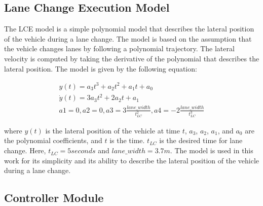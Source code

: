 \subsection{Lane Change Execution Model}
The LCE model is a simple polynomial model that describes the lateral position of the vehicle during a lane change. The model is based on the assumption that the vehicle changes lanes by following a polynomial trajectory. The lateral velocity is computed by taking the derivative of the polynomial that describes the lateral position. The model is given by the following equation:

\begin{multline}
    y(t) = a_3 t^3 + a_2 t^2 + a_1 t + a_0\\
    \dot{y}(t) = 3a_3 t^2 + 2a_2 t + a_1\\
    a1 = 0, a2 = 0, a3 = 3 \frac{lane\_width}{t_{LC}^2}, a4 = -2 \frac{lane\_width}{t_{LC}^3}
\end{multline}

where $y(t)$ is the lateral position of the vehicle at time $t$, $a_3$, $a_2$, $a_1$, and $a_0$ are the polynomial coefficients, and $t$ is the time. $t_{LC}$ is the desired time for lane change. Here, $t_{LC} = 5 seconds$ and $lane\_width = 3.7 m$. The model is used in this work for its simplicity and its ability to describe the lateral position of the vehicle during a lane change.



\subsection{Controller Module}


